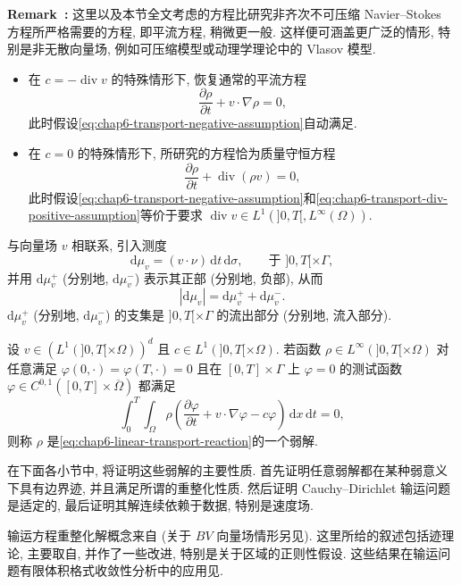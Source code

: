 \begin{sloppypar}
\par\noindent{}\textbf{Remark~\thechaptersixsectiononeremark:}\label{rem:chap6-transport-general-equation}
这里以及本节全文考虑的方程比研究非齐次不可压缩 Navier--Stokes 方程所严格需要的方程, 即平流方程, 稍微更一般. 这样便可涵盖更广泛的情形, 特别是非无散向量场, 例如可压缩模型或动理学理论中的 Vlasov 模型.
\begin{itemize}
 \item 在 $c=-\operatorname{div}v$ 的特殊情形下, 恢复通常的平流方程
 \[
  \frac{\partial\rho}{\partial t}+v\cdot\nabla\rho=0,
 \]
 此时假设\eqref{eq:chap6-transport-negative-assumption}自动满足.
 \item 在 $c=0$ 的特殊情形下, 所研究的方程恰为质量守恒方程
 \[
  \frac{\partial\rho}{\partial t}+\operatorname{div}(\rho v)=0,
 \]
 此时假设\eqref{eq:chap6-transport-negative-assumption}和\eqref{eq:chap6-transport-div-positive-assumption}等价于要求 $\operatorname{div}v\in L^1(]0,T[,L^\infty(\Omega))$.
\end{itemize}

与向量场 $v$ 相联系, 引入测度
\[
 \mathrm d\mu_v=(v\cdot\nu)\,\mathrm dt\,\mathrm d\sigma,
 \qquad\text{于 } ]0,T[\times\Gamma,
\]
并用 $\mathrm d\mu_v^+$ (分别地, $\mathrm d\mu_v^-$) 表示其正部 (分别地, 负部), 从而
\[
 |\mathrm d\mu_v|=\mathrm d\mu_v^++\mathrm d\mu_v^-.
\]
$\mathrm d\mu_v^+$ (分别地, $\mathrm d\mu_v^-$) 的支集是 $]0,T[\times\Gamma$ 的流出部分 (分别地, 流入部分).

\begin{Definition}
\label{def:chap6-transport-weak-solution}
设 $v\in(L^1(]0,T[\times\Omega))^d$ 且 $c\in L^1(]0,T[\times\Omega)$. 若函数 $\rho\in L^\infty(]0,T[\times\Omega)$ 对任意满足 $\varphi(0,\cdot)=\varphi(T,\cdot)=0$ 且在 $[0,T]\times\Gamma$ 上 $\varphi=0$ 的测试函数 $\varphi\in C^{0,1}([0,T]\times\overline\Omega)$ 都满足
\[
 \int_0^T\int_\Omega
 \rho\left(\frac{\partial\varphi}{\partial t}+v\cdot\nabla\varphi-c\varphi\right)
 \,\mathrm dx\,\mathrm dt=0,
\]
则称 $\rho$ 是\eqref{eq:chap6-linear-transport-reaction}的一个弱解.
\end{Definition}

在下面各小节中, 将证明这些弱解的主要性质. 首先证明任意弱解都在某种弱意义下具有边界迹, 并且满足所谓的重整化性质. 然后证明 Cauchy--Dirichlet 输运问题是适定的, 最后证明其解连续依赖于数据, 特别是速度场.

输运方程重整化解概念来自 (关于 $BV$ 向量场情形另见). 这里所给的叙述包括迹理论, 主要取自, 并作了一些改进, 特别是关于区域的正则性假设. 这些结果在输运问题有限体积格式收敛性分析中的应用见.


\end{sloppypar}
